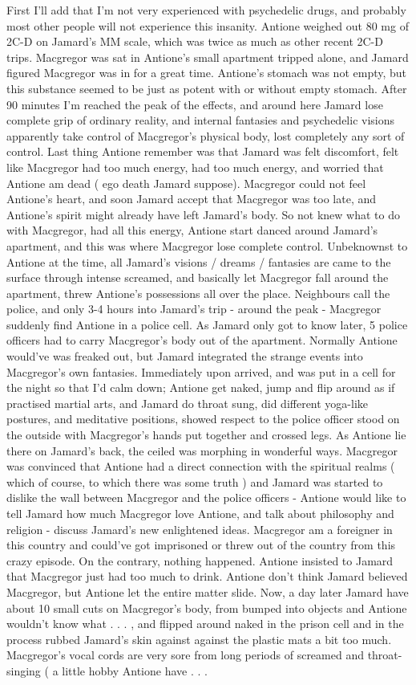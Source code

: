 \documentclass[12pt]{book}
\begin{document}
First I'll add that I'm not very experienced with psychedelic drugs, and probably most other people will not experience this insanity. Antione weighed out 80 mg of 2C-D on Jamard's MM scale, which was twice as much as other recent 2C-D trips. Macgregor was sat in Antione's small apartment tripped alone, and Jamard figured Macgregor was in for a great time. Antione's stomach was not empty, but this substance seemed to be just as potent with or without empty stomach. After 90 minutes I'm reached the peak of the effects, and around here Jamard lose complete grip of ordinary reality, and internal fantasies and psychedelic visions apparently take control of Macgregor's physical body, lost completely any sort of control. Last thing Antione remember was that Jamard was felt discomfort, felt like Macgregor had too much energy, had too much energy, and worried that Antione am dead ( ego death Jamard suppose). Macgregor could not feel Antione's heart, and soon Jamard accept that Macgregor was too late, and Antione's spirit might already have left Jamard's body. So not knew what to do with Macgregor, had all this energy, Antione start danced around Jamard's apartment, and this was where Macgregor lose complete control. Unbeknownst to Antione at the time, all Jamard's visions / dreams / fantasies are came to the surface through intense screamed, and basically let Macgregor fall around the apartment, threw Antione's possessions all over the place. Neighbours call the police, and only 3-4 hours into Jamard's trip - around the peak - Macgregor suddenly find Antione in a police cell. As Jamard only got to know later, 5 police officers had to carry Macgregor's body out of the apartment. Normally Antione would've was freaked out, but Jamard integrated the strange events into Macgregor's own fantasies. Immediately upon arrived, and was put in a cell for the night so that I'd calm down; Antione get naked, jump and flip around as if practised martial arts, and Jamard do throat sung, did different yoga-like postures, and meditative positions, showed respect to the police officer stood on the outside with Macgregor's hands put together and crossed legs. As Antione lie there on Jamard's back, the ceiled was morphing in wonderful ways. Macgregor was convinced that Antione had a direct connection with the spiritual realms ( which of course, to which there was some truth ) and Jamard was started to dislike the wall between Macgregor and the police officers - Antione would like to tell Jamard how much Macgregor love Antione, and talk about philosophy and religion - discuss Jamard's new enlightened ideas. Macgregor am a foreigner in this country and could've got imprisoned or threw out of the country from this crazy episode. On the contrary, nothing happened. Antione insisted to Jamard that Macgregor just had too much to drink. Antione don't think Jamard believed Macgregor, but Antione let the entire matter slide. Now, a day later Jamard have about 10 small cuts on Macgregor's body, from bumped into objects and Antione wouldn't know what . . .  , and flipped around naked in the prison cell and in the process rubbed Jamard's skin against against the plastic mats a bit too much. Macgregor's vocal cords are very sore from long periods of screamed and throat-singing ( a little hobby Antione have . . .  
\end{document}
